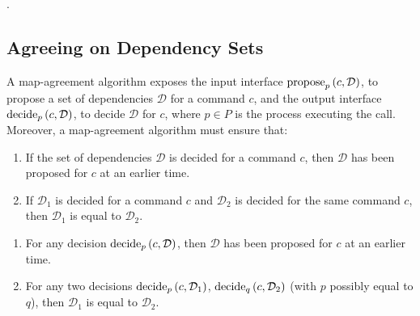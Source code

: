 

.


\subsection{Agreeing on Dependency Sets}
\label{map-algo}

A map-agreement algorithm exposes the input interface $\operatorname{propose}_p\left( c, \mathcal{D} \right)$, to propose a set of dependencies $\mathcal{D}$ for a command $c$, and the output interface $\operatorname{decide}_p\left( c, \mathcal{D} \right)$, to decide $\mathcal{D}$ for $c$, where $p\in P$ is the process executing the call.
Moreover, a map-agreement algorithm must ensure that: 
\begin{enumerate}
    \item If the set of dependencies $\mathcal{D}$ is decided for a command $c$, then $\mathcal{D}$ has been proposed for $c$ at an earlier time.
    \item If $\mathcal{D}_1$ is decided for a command $c$ and $\mathcal{D}_2$ is decided for the same command $c$, then $\mathcal{D}_1$ is equal to $\mathcal{D}_2$.
 \end{enumerate}


\begin{enumerate}
    \item For any decision $\operatorname{decide}_p\left( c, \mathcal{D} \right)$, then $\mathcal{D}$ has been proposed for $c$ at an earlier time.
    \item For any two decisions $\operatorname{decide}_p\left( c, \mathcal{D}_1 \right)$, $\operatorname{decide}_q\left( c, \mathcal{D}_2 \right)$ (with $p$ possibly equal to $q$), then $\mathcal{D}_1$ is equal to $\mathcal{D}_2$.


\end{enumerate}


